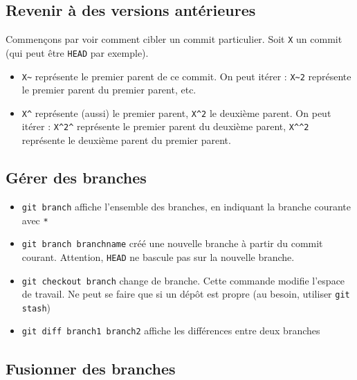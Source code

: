 \documentclass[french]{report}
\newcommand\itemb{\item[$\bullet$]}
\begin{document}

\subsection{Revenir à des versions antérieures}

Commençons par voir comment cibler un commit particulier.
Soit \texttt{X} un commit (qui peut être \texttt{HEAD} par exemple).

\begin{itemize}
    \itemb \texttt{X\textasciitilde} représente le premier parent de ce commit.
    On peut itérer : \texttt{X\textasciitilde2} représente le premier parent du premier parent, etc.
    \itemb \texttt{X\^{}} représente (aussi) le premier parent, \texttt{X\^{}2} le deuxième parent.
    On peut itérer : \texttt{X\^{}2\^{}} représente le premier parent du deuxième parent, \texttt{X\^{}\^{}2} représente le deuxième parent du premier parent.
\end{itemize}

\subsection{Gérer des branches}

\begin{itemize}
    \itemb \texttt{git branch} affiche l'ensemble des branches, en indiquant la branche courante avec \texttt{*}
    \itemb \texttt{git branch branchname} créé une nouvelle branche à partir du commit courant.
    Attention, \texttt{HEAD} ne bascule pas sur la nouvelle branche.
    \itemb \texttt{git checkout branch} change de branche.
    Cette commande modifie l'espace de travail.
    Ne peut se faire que si un dépôt est propre (au besoin, utiliser \texttt{git stash})
    \itemb \texttt{git diff branch1 branch2} affiche les différences entre deux branches
\end{itemize}

\subsection{Fusionner des branches}
\end{document}
